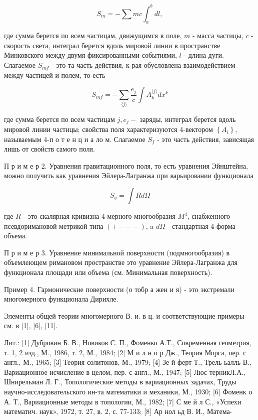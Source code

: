 \documentclass[10pt]{article}
\begin{document}
\[

S_{m}=-\sum m c \int_{a}^{b} d l,

\]



где сумма берется по всем частицам, движущимся в поле, $m$ - масса частицы, $c$ - скорость света, интеграл берется вдоль мировой линии в пространстве Минковского между двумя фиксированными событиями, $l$ - длина дуги. Слагаемое $S_{m f}$ - это та часть действия, к-рая обусловлена взаимодействием между частицей и полем, то есть



\[

S_{m f}=-\sum_{\langle j\rangle} \frac{e_{j}}{c} \int A_{k}^{\langle j\rangle} d x^{k}

\]



где сумма берется по всем частицам $j, e_{j}-$ заряды, интеграл берется вдоль мировой линии частицы; свойства поля характеризуются 4-вектором $\left\{A_{i}\right\}$, называемым 4-п о т е н ц и а ло м. Слагаемое $S_{f}$ - это часть действия, зависящая лишь от свойств самого поля.



П р и м е р 2. Уравнения гравитационного поля, то есть уравнения Эйнштейна, можно получить как уравнения Эйлера-Лагранжа при варьировании функционала



\[

S_{g}=\int R d \Omega

\]



где $R$ - это скалярная кривизна 4-мерного многообразия $M^{4}$, снабженного псевдоримановой метрикой типа $(+---)$, a $d \Omega$ - стандартная 4-форма объема.



П р и м е р 3. Уравнение минимальной поверхности (подмногообразия) в объемлеющем римановом пространстве это уравнение Эйлера-Лагранжа для функционала площади или объема (см. Минимальная поверхность).



Пример 4. Гармонические поверхности (о тобр а жен и я) - это экстремали многомерного функционала Дирихле.



Элементы общей теории многомерного В. и. в ц. и соответствующие примеры см. в [1], [6], [11].



Лит.: [1] Дубровин Б. В., Новиков С. П., Фоменко А.Т., Современная геометрия, т. 1, 2 изд., М., 1986, т. 2, М., 1984; [2] М и л н о р Дж., Теория Морса, пер. с англ., М., 1965; [3] Теория солитонов, М., 1979; [4] Зе й ферт Т., Трель ьалль В., Вариационное исчисление в целом, пер. с англ., М., 1947; [5] Люс терникЛ.А., Шнирельман Л. Г., Топологические методы в вариационных задачах, Труды научно-исследовательского ин-та математики и механики, М., 1930; [6] Фоменк о А. Т., Вариационные методы в топологии, М., 1982; [7] С ме й л С., «Успехи математич. наук», 1972, т. 27, в. 2, с. 77-133; [8] Ар нол ьд В. И., Матема-
\end{document}
